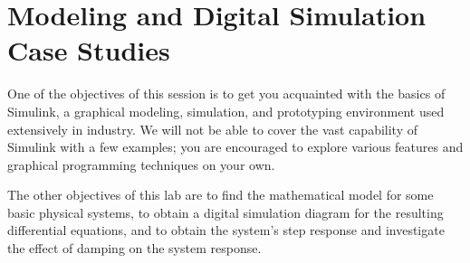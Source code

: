 

\chapter{Modeling and Digital Simulation Case Studies} \label{ch.ModSim}

One of the objectives of this session is to get you acquainted with the basics of Simulink, a graphical modeling, simulation, and prototyping environment used extensively in industry.  We will not be able to cover the vast capability of Simulink with a few examples; you are encouraged to explore various features and graphical programming techniques on your own.
\par
The other objectives of this lab are to find the mathematical model for some basic physical systems, to obtain a digital simulation diagram for the resulting differential equations, and to obtain the system's step response and investigate the effect of damping on the system response.

